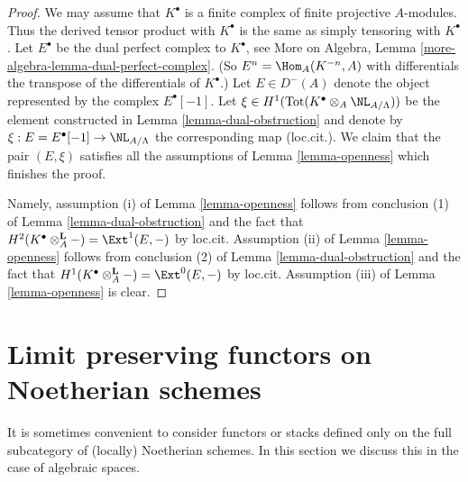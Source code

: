 \begin{proof}
We may assume that $K^\bullet$ is a finite complex of finite projective
$A$-modules. Thus the derived tensor product with $K^\bullet$ is the
same as simply tensoring with $K^\bullet$. Let
$E^\bullet$ be the dual perfect complex to $K^\bullet$, see
More on Algebra, Lemma \ref{more-algebra-lemma-dual-perfect-complex}.
(So $E^n = \Hom_A(K^{-n}, A)$ with differentials the transpose of the
differentials of $K^\bullet$.) Let $E \in D^{-}(A)$ denote the
object represented by the complex $E^\bullet[-1]$.
Let $\xi \in H^1(\text{Tot}(K^\bullet \otimes_A \NL_{A/\Lambda}))$
be the element constructed in Lemma \ref{lemma-dual-obstruction}
and denote by $\xi : E = E^\bullet[-1] \to \NL_{A/\Lambda}$ the corresponding
map (loc.cit.). We claim that the pair $(E, \xi)$ satisfies all the
assumptions of Lemma \ref{lemma-openness} which finishes the proof.

\medskip\noindent
Namely, assumption (i) of Lemma \ref{lemma-openness} follows from conclusion
(1) of Lemma \ref{lemma-dual-obstruction}
and the fact that $H^2(K^\bullet \otimes_A^\mathbf{L} -) =
\Ext^1(E, -)$ by loc.cit. Assumption (ii) of
Lemma \ref{lemma-openness} follows from conclusion (2) of
Lemma \ref{lemma-dual-obstruction}
and the fact that $H^1(K^\bullet \otimes_A^\mathbf{L} -) =
\Ext^0(E, -)$ by loc.cit. Assumption (iii) of Lemma \ref{lemma-openness}
is clear.
\end{proof}







\section{Limit preserving functors on Noetherian schemes}
\label{section-noetherian}

\noindent
It is sometimes convenient to consider functors or stacks defined only
on the full subcategory of (locally) Noetherian schemes. In this section
we discuss this in the case of algebraic spaces.

